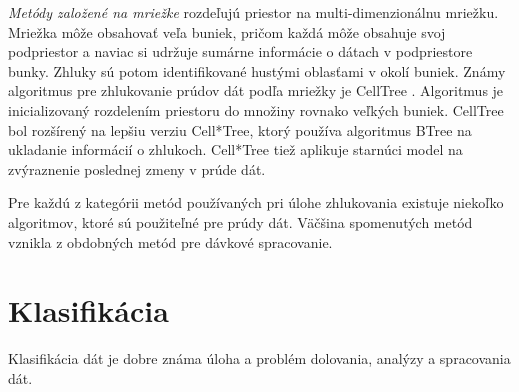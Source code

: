 \textit{Metódy založené na mriežke}
rozdeľujú priestor na multi-dimenzionálnu mriežku. Mriežka môže obsahovať veľa buniek, pričom každá môže obsahuje svoj podpriestor a naviac si udržuje sumárne informácie o dátach v podpriestore bunky. Zhluky sú potom identifikované hustými oblasťami v okolí buniek. Známy algoritmus pre zhlukovanie prúdov dát podľa mriežky je CellTree \citep{han2011data}. Algoritmus je inicializovaný rozdelením priestoru do množiny rovnako veľkých buniek. CellTree bol rozšírený na lepšiu verziu Cell*Tree, ktorý používa algoritmus BTree na ukladanie informácií o zhlukoch. Cell*Tree tiež aplikuje starnúci model na zvýraznenie poslednej zmeny v prúde dát.
\par
Pre každú z kategórii metód používaných pri úlohe zhlukovania existuje niekoľko algoritmov, ktoré sú použiteľné pre prúdy dát. Väčšina spomenutých metód vznikla z obdobných metód pre dávkové spracovanie.

\section{Klasifikácia}
\label{ulohy-klasifikacia}
Klasifikácia dát je dobre známa úloha a problém dolovania, analýzy a spracovania dát. 

